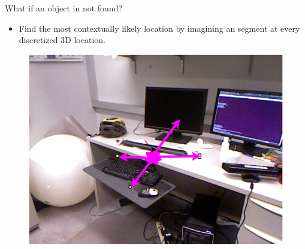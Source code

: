 \documentclass{beamer}
\begin{document}
\begin{frame}{What if an object in not found?}
\begin{itemize}
\item Find the most contextually likely location by imagining an segment at every discretized 3D location.
\end{itemize}
 \begin{figure}   
 \includegraphics[scale=0.3]{heatImage.png} 
 \end{figure}
\end{frame}
\end{document}
